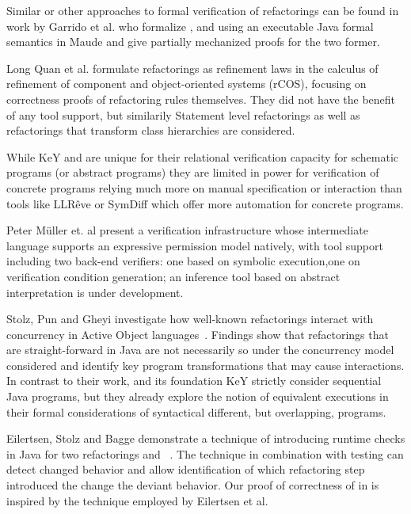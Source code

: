Similar or other approaches to formal verification of refactorings can be found in work by
Garrido et al. \cite{garrido2006formal} who formalize ,
 and  using an executable
Java formal semantics in Maude and give partially mechanized proofs for the two former.

Long Quan et al. \cite{DBLP:conf/isola/QuanQL08} formulate refactorings as refinement
laws in the calculus of refinement of component and object-oriented systems (rCOS),
focusing on correctness proofs of refactoring rules themselves.
They did not have the benefit of any tool support, but similarily 
Statement level refactorings as well as refactorings that transform class hierarchies are considered.

While KeY and \Refinity{} are unique for their relational verification capacity for
schematic programs (or abstract programs) they are limited in power for verification
of concrete programs relying much more on manual specification or interaction \cite{DBLP:conf/aplas/Steinhofel20}
than tools like LLRêve \cite{DBLP:journals/jar/KieferKU18} or SymDiff \cite{DBLP:conf/cav/LahiriHKR12}
which offer more automation for concrete programs.

Peter M{\"u}ller et. al present a verification infrastructure whose intermediate language supports
an expressive permission model natively, with tool support including two back-end verifiers: one based on
symbolic execution,one on verification condition generation; an inference tool based on abstract
interpretation is  under development. \cite{DBLP:series/natosec/0001SS17}

Stolz, Pun and Gheyi investigate how well-known refactorings interact with concurrency in Active Object languages~\cite{DBLP:conf/isola/StolzPG20}.
Findings show that refactorings that are straight-forward in Java are not necessarily so under the concurrency model considered and identify key
program transformations that may cause interactions.
In contrast to their work, \Refinity{} and its foundation KeY strictly consider sequential Java programs,
but they already explore the notion of equivalent executions in their formal considerations of syntactical different, but overlapping, programs.

Eilertsen, Stolz and Bagge demonstrate a technique of introducing runtime checks in Java for two refactorings  and
~\cite{stolz:isolarefa}. The technique in combination with testing can detect changed behavior and allow identification
of which refactoring step introduced the change the deviant behavior.
Our proof of correctness of  in \Refinity{} is inspired by the technique employed by Eilertsen et al.


